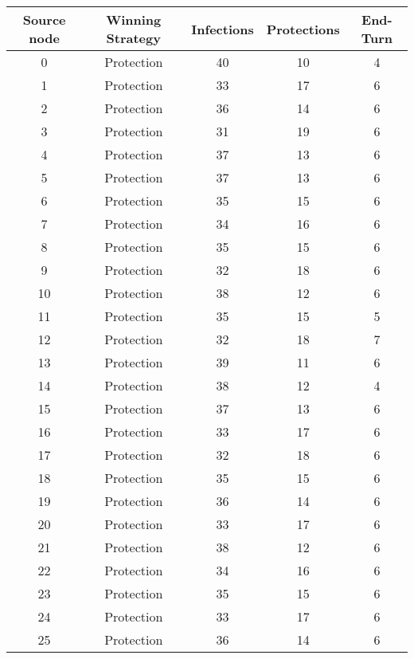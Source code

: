 \documentclass[results.tex]{subfiles}
\begin{document}
\begin{center}
  \begin{tabular}{| c || c | c | c | c |}
    \hline
    {\bfseries Source node} & {\bfseries Winning Strategy} & {\bfseries Infections} & {\bfseries Protections} & {\bfseries End-Turn} \\  %
    \hline\hline
    0 & Protection & 40 & 10 & 4 \\ 
    \hline
    1 & Protection & 33 & 17 & 6 \\ 
    \hline
    2 & Protection & 36 & 14 & 6 \\ 
    \hline
    3 & Protection & 31 & 19 & 6 \\ 
    \hline
    4 & Protection & 37 & 13 & 6 \\ 
    \hline
    5 & Protection & 37 & 13 & 6 \\ 
    \hline
    6 & Protection & 35 & 15 & 6 \\ 
    \hline
    7 & Protection & 34 & 16 & 6 \\ 
    \hline
    8 & Protection & 35 & 15 & 6 \\ 
    \hline
    9 & Protection & 32 & 18 & 6 \\ 
    \hline
    10 & Protection & 38 & 12 & 6 \\ 
    \hline
    11 & Protection & 35 & 15 & 5 \\ 
    \hline
    12 & Protection & 32 & 18 & 7 \\ 
    \hline
    13 & Protection & 39 & 11 & 6 \\ 
    \hline
    14 & Protection & 38 & 12 & 4 \\ 
    \hline
    15 & Protection & 37 & 13 & 6 \\ 
    \hline
    16 & Protection & 33 & 17 & 6 \\ 
    \hline
    17 & Protection & 32 & 18 & 6 \\ 
    \hline
    18 & Protection & 35 & 15 & 6 \\ 
    \hline
    19 & Protection & 36 & 14 & 6 \\ 
    \hline
    20 & Protection & 33 & 17 & 6 \\ 
    \hline
    21 & Protection & 38 & 12 & 6 \\ 
    \hline
    22 & Protection & 34 & 16 & 6 \\ 
    \hline
    23 & Protection & 35 & 15 & 6 \\ 
    \hline
    24 & Protection & 33 & 17 & 6 \\ 
    \hline
    25 & Protection & 36 & 14 & 6 \\ 

\end{tabular}
\end{center}
\end{document}
